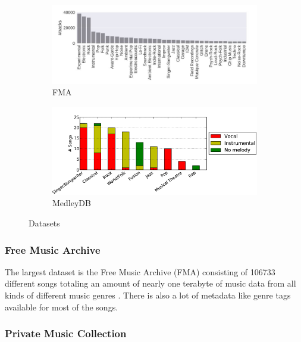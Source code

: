 \begin{figure}[htbp]
{{	\begin{subfigure}{0.5\textwidth}
		\centering
		\includegraphics[scale=0.35]{Images/fma_genre.JPG}
		\caption{FMA \cite[p. 4]{fma1}}
		\label{fmadist}
	\end{subfigure}
	\begin{subfigure}{0.5\textwidth}
		\centering
		\includegraphics[scale=0.35]{Images/MedleyDB1.png}
		\caption{MedleyDB \cite[p. 2]{medleydb1}}
		\label{medleydbdist}
	\end{subfigure}
	}}
	\caption{Datasets}
	\label{fig:datasetdist}
\end{figure}
\FloatBarrier

\subsubsection{Free Music Archive}

The largest dataset is the Free Music Archive (FMA) consisting of 106733 different songs totaling an amount of nearly one terabyte of music data from all kinds of different music genres \cite{fma1}. There is also a lot of metadata like genre tags available for most of the songs.

\subsubsection{Private Music Collection}

